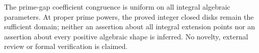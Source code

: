 \documentclass[11pt]{article}
\begin{document}
The prime-gap coefficient congruence is uniform on all integral
algebraic parameters. At proper prime powers, the proved integer
closed disks remain the sufficient domain; neither an assertion about
all integral extension points nor an assertion about every positive
algebraic shape is inferred. No novelty, external review or formal
verification is claimed.
\end{document}
